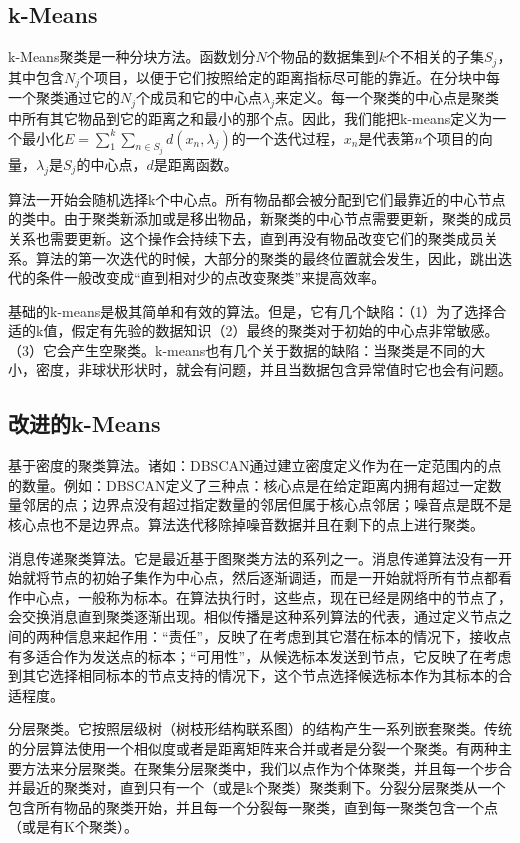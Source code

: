 \documentclass{article}
\begin{document}
\subsection{k-Means}
k-Means聚类是一种分块方法。函数划分$N$个物品的数据集到$k$个不相关的子集$S_j$，其中包含$N_j$个项目，以便于它们按照给定的距离指标尽可能的靠近。在分块中每一个聚类通过它的$N_j$个成员和它的中心点$\lambda_j$来定义。每一个聚类的中心点是聚类中所有其它物品到它的距离之和最小的那个点。因此，我们能把k-means定义为一个最小化$E=\sum_1^k\sum_{n\in S_j}d(x_n,\lambda_j)$的一个迭代过程，$x_n$是代表第$n$个项目的向量，$\lambda_j$是$S_j$的中心点，$d$是距离函数。

算法一开始会随机选择k个中心点。所有物品都会被分配到它们最靠近的中心节点的类中。由于聚类新添加或是移出物品，新聚类的中心节点需要更新，聚类的成员关系也需要更新。这个操作会持续下去，直到再没有物品改变它们的聚类成员关系。算法的第一次迭代的时候，大部分的聚类的最终位置就会发生，因此，跳出迭代的条件一般改变成“直到相对少的点改变聚类”来提高效率。

基础的k-means是极其简单和有效的算法。但是，它有几个缺陷：（1）为了选择合适的k值，假定有先验的数据知识（2）最终的聚类对于初始的中心点非常敏感。（3）它会产生空聚类。k-means也有几个关于数据的缺陷：当聚类是不同的大小，密度，非球状形状时，就会有问题，并且当数据包含异常值时它也会有问题。

\subsection{改进的k-Means}
基于密度的聚类算法。诸如：DBSCAN通过建立密度定义作为在一定范围内的点的数量。例如：DBSCAN定义了三种点：核心点是在给定距离内拥有超过一定数量邻居的点；边界点没有超过指定数量的邻居但属于核心点邻居；噪音点是既不是核心点也不是边界点。算法迭代移除掉噪音数据并且在剩下的点上进行聚类。

消息传递聚类算法。它是最近基于图聚类方法的系列之一。消息传递算法没有一开始就将节点的初始子集作为中心点，然后逐渐调适，而是一开始就将所有节点都看作中心点，一般称为标本。在算法执行时，这些点，现在已经是网络中的节点了，会交换消息直到聚类逐渐出现。相似传播是这种系列算法的代表，通过定义节点之间的两种信息来起作用：“责任”，反映了在考虑到其它潜在标本的情况下，接收点有多适合作为发送点的标本；“可用性”，从候选标本发送到节点，它反映了在考虑到其它选择相同标本的节点支持的情况下，这个节点选择候选标本作为其标本的合适程度。

分层聚类。它按照层级树（树枝形结构联系图）的结构产生一系列嵌套聚类。传统的分层算法使用一个相似度或者是距离矩阵来合并或者是分裂一个聚类。有两种主要方法来分层聚类。在聚集分层聚类中，我们以点作为个体聚类，并且每一个步合并最近的聚类对，直到只有一个（或是k个聚类）聚类剩下。分裂分层聚类从一个包含所有物品的聚类开始，并且每一个分裂每一聚类，直到每一聚类包含一个点（或是有K个聚类）。
\end{document}
